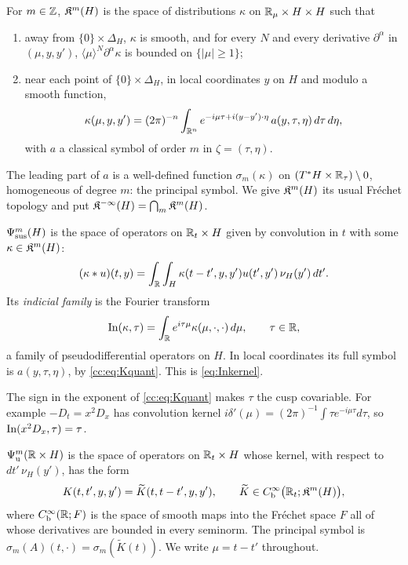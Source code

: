 \begin{definition}\label{cc:def:K}
For \(m\in\mathbb Z\), \(\mathfrak K^m(H)\) is the space of distributions \(\kappa\) on
\(\mathbb R_\mu\times H\times H\) such that
\begin{enumerate}
\item away from \(\{0\}\times\Delta_H\), \(\kappa\) is smooth, and for
every \(N\) and every derivative \(\partial^\alpha\) in \((\mu,y,y')\),
\(\langle\mu\rangle^N\partial^\alpha\kappa\) is bounded on
\(\{|\mu|\ge1\}\);
\item near each point of \(\{0\}\times\Delta_H\), in local coordinates
\(y\) on \(H\) and modulo a smooth function,
\begin{equation}\label{cc:eq:Kquant}
 \kappa(\mu,y,y')=(2\pi)^{-n}\int_{\mathbb R^n}e^{-i\mu\tau+i(y-y')\cdot\eta}\,
 a(y,\tau,\eta)\,d\tau\,d\eta ,
\end{equation}
with \(a\) a classical symbol of order \(m\) in \(\zeta=(\tau,\eta)\).
\end{enumerate}
The leading part of \(a\) is a well-defined function
\(\sigma_m(\kappa)\) on \((T^*H\times\mathbb R_\tau)\setminus0\), homogeneous of
degree \(m\): the principal symbol. We give \(\mathfrak K^m(H)\) its usual Fr\'echet
topology and put \(\mathfrak K^{-\infty}(H)=\bigcap_m\mathfrak K^m(H)\).
\end{definition}

\begin{definition}\label{cc:def:sus}
\(\Psi_{\mathrm{sus}}^m(H)\) is the space of operators on \(\mathbb R_t\times H\) given by
convolution in \(t\) with some \(\kappa\in\mathfrak K^m(H)\):
\[
 (\kappa*u)(t,y)=\int_\mathbb R\int_H\kappa(t-t',y,y')u(t',y')\,\nu_H(y')\,dt' .
\]
Its \emph{indicial family} is the Fourier transform
\begin{equation}\label{cc:eq:In}
 \operatorname{In}(\kappa,\tau)=\int_\mathbb R e^{i\tau\mu}\kappa(\mu,\cdot,\cdot)\,d\mu,
 \qquad\tau\in\mathbb R ,
\end{equation}
a family of pseudodifferential operators on \(H\). In local coordinates its
full symbol is \(a(y,\tau,\eta)\), by \eqref{cc:eq:Kquant}. This is
\eqref{eq:Inkernel}.
\end{definition}

The sign in the exponent of \eqref{cc:eq:Kquant} makes \(\tau\) the cusp
covariable. For example \(-D_t=x^2D_x\) has convolution kernel
\(i\delta'(\mu)=(2\pi)^{-1}\int\tau e^{-i\mu\tau}d\tau\), so
\(\operatorname{In}(x^2D_x,\tau)=\tau\).

\begin{definition}\label{cc:def:U}
\(\Psi_{\mathrm u}^m(\mathbb R\times H)\) is the space of operators on \(\mathbb R_t\times H\)
whose kernel, with respect to \(dt'\,\nu_H(y')\), has the form
\[
 K(t,t',y,y')=\widetilde K(t,t-t',y,y'),\qquad
 \widetilde K\in C^\infty_{\mathrm b}\bigl(\mathbb R_t;\mathfrak K^m(H)\bigr),
\]
where \(C^\infty_{\mathrm b}(\mathbb R;F)\) is the space of smooth maps into the Fr\'echet
space \(F\) all of whose derivatives are bounded in every seminorm. The
principal symbol is \(\sigma_m(A)(t,\cdot)=\sigma_m(\widetilde K(t))\).
We write \(\mu=t-t'\) throughout.
\end{definition}

